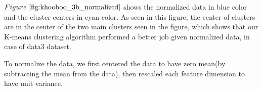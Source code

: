 \documentclass{article} %
\begin{document}
$Figure~\ref{fig:khooboo_3b_normalized}$ shows the normalized data in blue color and the cluster centers in cyan color. As seen in this figure, the center of clusters are in the center of the two main clusters seen in the figure, which shows that our K-means clustering algorithm performed a better job given normalized data, in case of data3 dataset.  

To normalize the data, we first centered the data to have zero mean(by subtracting the mean from the data), then rescaled each feature dimension to have unit variance. 

%
%
\end{document}
